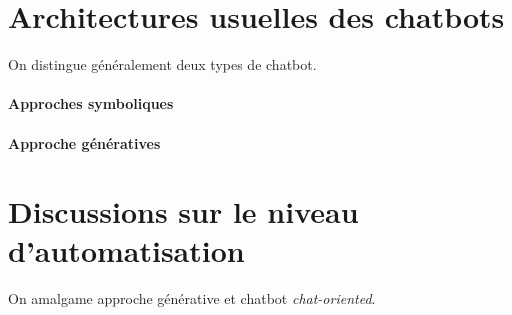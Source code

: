 	\section{Architectures usuelles des chatbots}
	\label{annex:B.2-CHATBOT-ARCHITECTURES}
	
		On distingue généralement deux types de chatbot.
	
		\paragraph{Approches symboliques}
			\cite{schuurmans-frasincar:2020:intent-classification-dialogue} %
			\cite{bocklisch-etal:2017:rasa-open-source} %
			\cite{hoyt-etal:2016:ibm-watson-analytics} %
	
		\paragraph{Approche génératives}
			\cite{uszkoreit:2017:transformer-novel-neural} %
			\cite{ni-etal:2022:recent-advances-deep} %
			\cite{openai:2023:chatgpt} %
			\cite{perpetual, non-exclusive license} %
			\cite{touvron-etal:2023:llama-open-foundation} %
			\cite{kaddour-etal:2023:challenges-applications-large} %

	\section{Discussions sur le niveau d'automatisation}
	\label{annex:B.2-CHATBOT-DISCUSSION-AUTOMATISATION}
		
			
		\begin{leftBarAuthorOpinion}
			On amalgame approche générative et chatbot \textit{chat-oriented}.
		\end{leftBarAuthorOpinion}
		\cite{}




